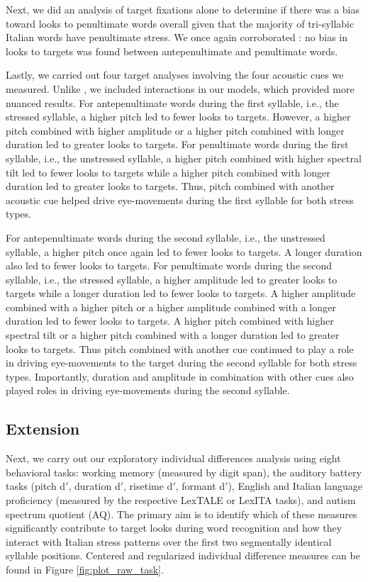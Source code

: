 Next, we did an analysis of target fixations alone to determine if there was a bias toward looks to penultimate words overall given that the majority of tri-syllabic Italian words have penultimate stress. We once again corroborated \cite{Sulpizio_McQueen_2012}: no bias in looks to targets was found between antepenultimate and penultimate words.

Lastly, we carried out four target analyses involving the four acoustic cues we measured. Unlike \cite{Sulpizio_McQueen_2012}, we included interactions in our models, which provided more nuanced results. For antepenultimate words during the first syllable, i.e., the stressed syllable, a higher pitch led to fewer looks to targets. However, a higher pitch combined with higher amplitude or a higher pitch combined with longer duration led to greater looks to targets. For penultimate words during the first syllable, i.e., the unstressed syllable, a higher pitch combined with higher spectral tilt led to fewer looks to targets while a higher pitch combined with longer duration led to greater looks to targets. Thus, pitch combined with another acoustic cue helped drive eye-movements during the first syllable for both stress types.

For antepenultimate words during the second syllable, i.e., the unstressed syllable, a higher pitch once again led to fewer looks to targets. A longer duration also led to fewer looks to targets. For penultimate words during the second syllable, i.e., the stressed syllable, a higher amplitude led to greater looks to targets while a longer duration led to fewer looks to targets. A higher amplitude combined with a higher pitch or a higher amplitude combined with a longer duration led to fewer looks to targets. A higher pitch combined with higher spectral tilt or a higher pitch combined with a longer duration led to greater looks to targets. Thus pitch combined with another cue continued to play a role in driving eye-movements to the target during the second syllable for both stress types. Importantly, duration and amplitude in combination with other cues also played roles in driving eye-movements during the second syllable. 

\subsection{Extension}

Next, we carry out our exploratory individual differences analysis \citep{Yanai2020} using eight behavioral tasks: working memory (measured by digit span), the auditory battery tasks (pitch d$'$, duration d$'$, risetime d$'$, formant d$'$), English and Italian language proficiency (measured by the respective LexTALE or LexITA tasks), and autism spectrum quotient (AQ). The primary aim is to identify which of these measures significantly contribute to target looks during word recognition and how they interact with Italian stress patterns over the first two segmentally identical syllable positions. Centered and regularized individual difference measures can be found in Figure \ref{fig:plot_raw_task}.

